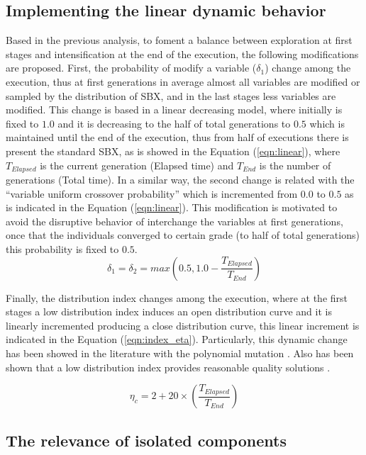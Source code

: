 \subsection{Implementing the linear dynamic behavior}
Based in the previous analysis, to foment a balance between exploration at first stages and intensification at the end of the execution, the following modifications are proposed.
%
First, the probability of modify a variable ($\delta_1$) change among the execution, thus at first generations in average almost all variables are modified or sampled by the distribution of SBX, and in the last stages less variables are modified.
%
This change is based in a linear decreasing model, where initially is fixed to $1.0$ and it is decreasing to the half of total generations to $0.5$ which is maintained until the end of the execution, thus from half of executions there is present the standard SBX, as is showed in the Equation (\ref{eqn:linear}), where $T_{Elapsed}$ is the current generation (Elapsed time) and $T_{End}$ is the number of generations (Total time).
%
In a similar way, the second change is related with the ``variable uniform crossover probability'' which is incremented from $0.0$ to $0.5$ as is indicated in the Equation (\ref{eqn:linear}).
%
This modification is motivated to avoid the disruptive behavior of interchange the variables at first generations, once that the individuals converged to certain grade (to half of total generations) this probability is fixed to $0.5$.
\begin{equation}\label{eqn:linear}
	\delta_1 = \delta_2 = max \left (0.5, 1.0 - \frac{T_{Elapsed}}{T_{End}} \right )
\end{equation}

%
Finally, the distribution index changes among the execution, where at the first stages a low distribution index induces an open distribution curve and it is linearly incremented producing a close distribution curve, this linear increment is indicated in the Equation (\ref{eqn:index_eta}).
%
Particularly, this dynamic change has been showed in the literature with the polynomial mutation \cite{zitzler1999multiobjective}.
%
Also has been shown that a low distribution index provides reasonable quality solutions \cite{hamdan2012distribution}.

\begin{equation}\label{eqn:index_eta}
 \eta_c = 2 + 20 \times \left ( \frac{T_{Elapsed}}{T_{End}} \right)
\end{equation}


\subsection{The relevance of isolated components}

